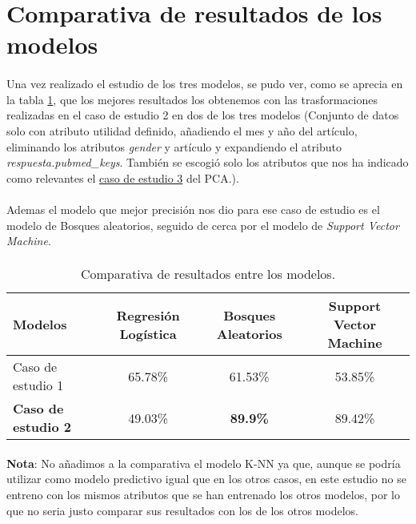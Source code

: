 \section{Comparativa de resultados de los modelos}
\label{resultados:compare}

\paragraph{}
Una vez realizado el estudio de los tres modelos, se pudo ver, como se aprecia en la tabla \ref{table:comparative}, que los mejores resultados los obtenemos con las trasformaciones realizadas en el caso de estudio 2 en dos de los tres modelos (Conjunto de datos solo con atributo utilidad definido, añadiendo el mes y año del artículo, eliminando los atributos \textit{gender} y artículo y expandiendo el atributo \textit{respuesta.pubmed\_keys}. También se escogió solo los atributos que nos ha indicado como relevantes el \hyperref[result:pca_case3]{caso de estudio 3} del PCA.).

\paragraph{}
Ademas el modelo que mejor precisión nos dio para ese caso de estudio es el modelo de Bosques aleatorios, seguido de cerca por el modelo de \textit{Support Vector Machine}.

\paragraph{}
\begin{table}[!htb]
	\begin{tabular}{ | p{4cm} | c | c | c | }
		\hline Modelos & Regresión Logística & \textbf{Bosques Aleatorios} & Support Vector Machine \\ 
		\hline
		\hline
		Caso de estudio 1 & 65.78\% & 61.53\% & 53.85\% \\
		\textbf{Caso de estudio 2} & 49.03\% & \textbf{89.9\%} & 89.42\% \\ \hline
	\end{tabular}
		\caption{Comparativa de resultados entre los modelos.} \label{table:comparative}
\end{table}

\paragraph{}
\textbf{Nota}: No añadimos a la comparativa el modelo K-NN ya que, aunque se podría utilizar como modelo predictivo igual que en los otros casos, en este estudio no se entreno con los mismos atributos que se han entrenado los otros modelos, por lo que no seria justo comparar sus resultados con los de los otros modelos.